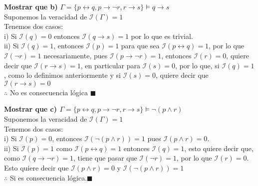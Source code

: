 \textbf{Mostrar que b)} $\Gamma = \{p\leftrightarrow q,p\rightarrow \neg r,r\rightarrow s\} \vDash q\rightarrow s$\\
Suponemos la veracidad de $\mathcal{I}(\Gamma)=1$\\
Tenemos dos casos:\\
 \indent i) Si $\mathcal{I}(q)=0$ entonces $\mathcal{I}(q\rightarrow s)=1$ por lo que es trivial.\\
\indent ii) Si $\mathcal{I}(q)=1$, entonces $\mathcal{I}(p)=1$ para que sea $\mathcal{I}(p\leftrightarrow q)=1$, por lo que $\mathcal{I}(\neg r)=1$ necesariamente, pues $\mathcal{I}(p\rightarrow \neg r)=1$, entonces $\mathcal{I}(r)=0$, quiere decir que $\mathcal{I}(r\rightarrow s)=1$, en particular para $\mathcal{I}(s)=0$, por lo que, si $\mathcal{I}(q)=1$, como lo definimos anteriormente y si $\mathcal{I}(s)=0$, quiere decir que $\mathcal{I}(r\rightarrow s)=0$\\
$\therefore$ No es consecuencia lógica $\blacksquare$
\vspace{10px}

\textbf{Mostrar que c) $\Gamma = \{p\leftrightarrow q,p\rightarrow \neg r,r\rightarrow s\} \vDash \neg (p\land r)$}\\
Suponemos la veracidad de $\mathcal{I}(\Gamma)=1$\\
Tenemos dos casos:\\
\indent i) Si $\mathcal{I}(p)=0$, entonces $\mathcal{I}(\neg(p\land r))=1$ pues $\mathcal{I}(p\land r)=0$.\\
\indent ii) Si $\mathcal{I}(p)=1$ como $\mathcal{I}(p \leftrightarrow q)=1$ entonces $\mathcal{I}(q)=1$, esto quiere decir que, como $\mathcal{I}(q\rightarrow \neg r)=1$, tiene que pasar que $\mathcal{I}(\neg r)=1$, por lo que $\mathcal{I}(r)=0$.\\
Esto quiere decir que $\mathcal{I}(p\land r)=0$ y $\mathcal{I}(\neg (p\land r))=1$\\
$\therefore$ Si es consecuencia lógica.$\blacksquare$
\vspace{10px}

